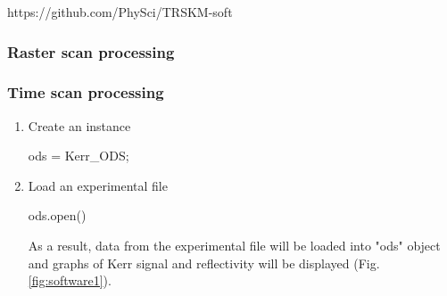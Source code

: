 \documentclass[14pt,a4paper] {article}
\begin{document}
https://github.com/PhySci/TRSKM-soft


\subsubsection{Raster scan processing}


\subsubsection{Time scan processing}

\begin{enumerate}
\item Create an instance

    ods = Kerr_ODS;
    
\item Load an experimental file
   
    ods.open()
    
As a result, data from the experimental file will be loaded into "ods" object and graphs of Kerr signal and reflectivity will be displayed (Fig. \ref{fig:software1}).


\end{enumerate}
\end{document}
